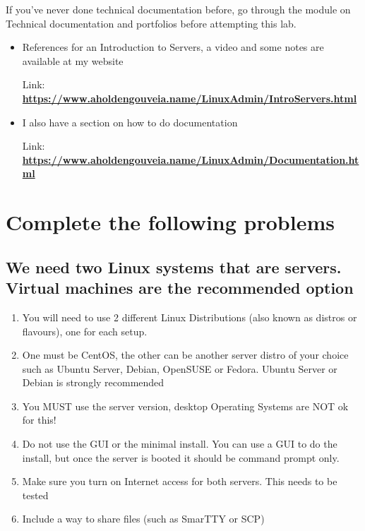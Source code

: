 \documentclass[12pt]{article}
\begin{document}
If you've never done technical documentation before, go through the module on Technical documentation and portfolios before attempting this lab.

    \begin{itemize}
\item References for an Introduction to Servers, a video and some notes are available at my website

Link: \href{https://www.aholdengouveia.name/LinuxAdmin/IntroServers.html}{\textbf{https://www.aholdengouveia.name/LinuxAdmin/IntroServers.html}} 


\item I also have a section on how to do documentation 

Link: \href{https://www.aholdengouveia.name/LinuxAdmin/Documentation.html}{\textbf{https://www.aholdengouveia.name/LinuxAdmin/Documentation.html}}


\end{itemize}

\section*{Complete the following problems}

\subsection*{We need two Linux systems that are servers.  Virtual machines are the recommended option}
    \begin{enumerate}
        \item You will need to use 2 different Linux Distributions (also known as distros or flavours), one for each setup.
        \item One must be CentOS, the other can be another server distro of your choice such as Ubuntu Server, Debian, OpenSUSE or Fedora.  Ubuntu Server or Debian is strongly recommended
        \item You MUST use the server version, desktop Operating Systems  are NOT ok for this! 
        \item Do not use the GUI or the minimal install. You can use a GUI to do the install, but once the server is booted it should be command prompt only.
        \item Make sure you turn on Internet access for both servers.  This needs to be tested
        \item Include a way to share files (such as SmarTTY or SCP)


    \end{enumerate}
\end{document}
